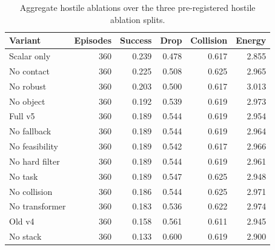 \begin{table}[t]
\centering
\caption{Aggregate hostile ablations over the three pre-registered hostile ablation splits.}
\label{tab:ablation-aggregate}
\scriptsize
\begin{tabular}{lrrrrr}
\toprule
Variant & Episodes & Success & Drop & Collision & Energy \\
\midrule
Scalar only & 360 & 0.239 & 0.478 & 0.617 & 2.855 \\
No contact & 360 & 0.225 & 0.508 & 0.625 & 2.965 \\
No robust & 360 & 0.203 & 0.500 & 0.617 & 3.013 \\
No object & 360 & 0.192 & 0.539 & 0.619 & 2.973 \\
Full v5 & 360 & 0.189 & 0.544 & 0.619 & 2.954 \\
No fallback & 360 & 0.189 & 0.544 & 0.619 & 2.964 \\
No feasibility & 360 & 0.189 & 0.542 & 0.617 & 2.966 \\
No hard filter & 360 & 0.189 & 0.544 & 0.619 & 2.961 \\
No task & 360 & 0.189 & 0.547 & 0.625 & 2.948 \\
No collision & 360 & 0.186 & 0.544 & 0.625 & 2.971 \\
No transformer & 360 & 0.183 & 0.536 & 0.622 & 2.974 \\
Old v4 & 360 & 0.158 & 0.561 & 0.611 & 2.945 \\
No stack & 360 & 0.133 & 0.600 & 0.619 & 2.900 \\
\bottomrule
\end{tabular}
\end{table}
